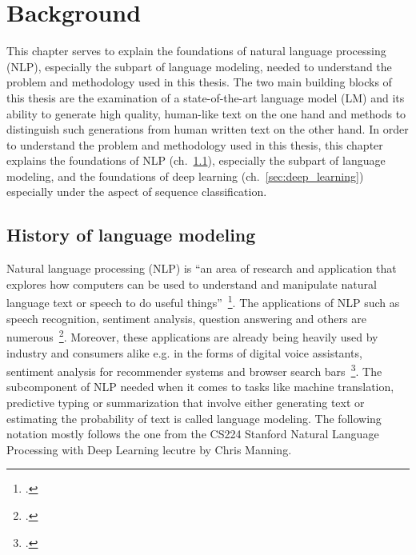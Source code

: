 \section{Background}
\label{ch:background}

This chapter serves to explain the foundations of natural language processing (NLP), especially the subpart of
language modeling, needed to understand the problem and methodology used in this thesis. The two main building blocks
of this thesis are the examination of a state-of-the-art language model (LM) and its ability to generate high quality,
human-like text on the one hand and methods to distinguish such generations from human written text on the other hand.
In order to understand the problem and methodology used in this thesis, this chapter explains the foundations
of NLP (ch.~\ref{sec:history_of_language_modeling}), especially the subpart of language
modeling, and the foundations of deep learning (ch.~\ref{sec:deep_learning}) especially under the aspect of sequence
classification.

\subsection{History of language modeling}
\label{sec:history_of_language_modeling}

Natural language processing (NLP) is “an area of research and application that explores how computers can be used to
understand and manipulate natural language text or speech to do useful things”~\footcite{doi:10.1002/aris.1440370103}.
The applications of NLP such as speech recognition, sentiment analysis,
question answering and others are numerous~\footcite{DBLP:journals/corr/GattK17}.
Moreover, these applications are already being heavily used by industry and
consumers alike e.g. in the forms of digital voice assistants, sentiment analysis for recommender systems
and browser search bars~\footcite{8012330,10.1145/3064663.3064672,GoogleSearch}. The subcomponent of NLP
needed when it comes to tasks like machine translation, predictive typing or summarization that involve either
generating text or estimating the probability of text is called language modeling. The following notation mostly
follows the one from the CS224 Stanford Natural Language Processing with Deep Learning lecutre by Chris Manning.

